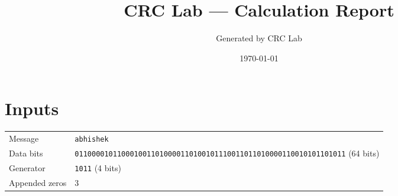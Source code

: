 \documentclass[11pt,a4paper]{article}
\title{CRC Lab --- Calculation Report}
\author{Generated by CRC Lab}
\date{\today}
\begin{document}
\maketitle

\section{Inputs}
\begin{tabular}{ll}
\toprule
Message & \texttt{abhishek} \\
Data bits & \texttt{0110000101100010011010000110100101110011011010000110010101101011} (64 bits) \\
Generator & \texttt{1011} (4 bits) \\
Appended zeros & 3 \\
\bottomrule
\end{tabular}
\end{document}
